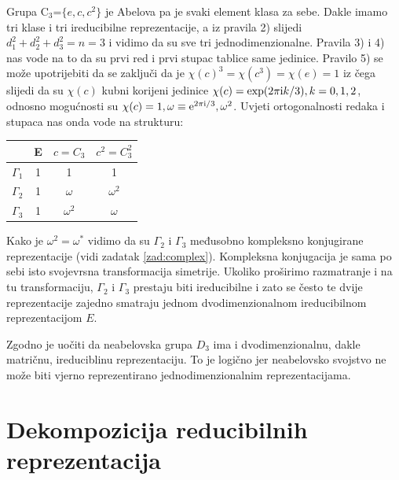 \begin{primjer}
Grupa C$_3$=$\{e, c, c^2\}$ je Abelova pa je svaki element klasa za sebe.
Dakle imamo tri klase i tri ireducibilne reprezentacije,
a iz pravila 2) slijedi $d_{1}^2+d_{2}^2+d_{3}^2 = n =3$
i vidimo da su sve tri jednodimenzionalne.
Pravila 3) i 4) nas vode na to da su prvi red i prvi stupac
tablice same jedinice.
Pravilo 5) se može upotrijebiti da se zaključi da
je $\chi(c)^3=\chi(c^3)=\chi(e)=1$ iz čega slijedi da su $\chi(c)$
kubni korijeni jedinice $\chi(c) = \exp(2\pi \textrm{i} k/3), k=0, 1, 2$,
odnosno mogućnosti su $\chi(c)=1, \omega\equiv \textrm{e}^{2\pi \textrm{i}/3}, \omega^2$.
Uvjeti ortogonalnosti redaka i stupaca nas onda vode na
strukturu:
\begin{center}
\begin{tabular}{c|ccc}
  & E & $c=C_3$  & $c^2=C_{3}^2$ \\ \hline
$\Gamma_{1}$ & 1 & 1& 1 \\
$\Gamma_{2}$  & 1 & $\omega$ &$\omega^2$  \\
$\Gamma_{3}$  & 1 &$\omega^2$ & $\omega$ 
\end{tabular}
\end{center}
Kako je $\omega^2 = \omega^* $ vidimo da
su $\Gamma_2$ i $\Gamma_3$ međusobno kompleksno
konjugirane reprezentacije (vidi zadatak \ref{zad:complex}).
Kompleksna konjugacija je sama po sebi isto svojevrsna transformacija
simetrije. Ukoliko proširimo razmatranje i na tu transformaciju, $\Gamma_2$
i $\Gamma_3$ prestaju biti ireducibilne i zato se često te dvije reprezentacije
zajedno smatraju jednom dvodimenzionalnom ireducibilnom reprezentacijom $E$.
\end{primjer}


Zgodno je uočiti da neabelovska grupa $D_3$ ima i dvodimenzionalnu, dakle matričnu,
ireduciblinu reprezentaciju. To je logično jer neabelovsko svojstvo ne može biti
vjerno reprezentirano jednodimenzionalnim reprezentacijama. 

\section{Dekompozicija reducibilnih reprezentacija}

